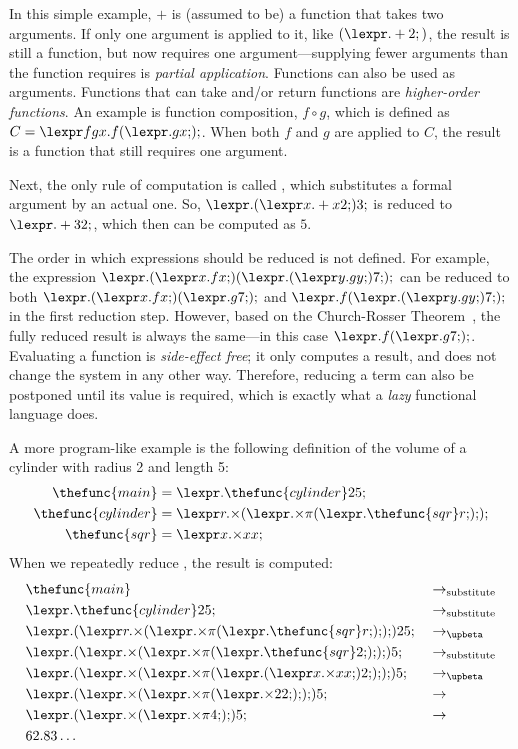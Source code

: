 In this simple example, $+$ is (assumed to be) a function that takes two arguments.
If only one argument is applied to it, like $(\lexpr.+ 2;)$, the result is still a function, but now requires one argument---supplying fewer arguments than the function requires is \emph{partial application}.
Functions can also be used as arguments.
Functions that can take and/or return functions are \emph{higher-order functions}.
An example is function composition, $f\circ g$, which is defined as $C=\lexpr f g x.f ({\lexpr.g x;});$.
When both $f$ and $g$ are applied to $C$, the result is a function that still requires one argument.

Next, the only rule of computation is called \emph{}, which substitutes a formal argument by an actual one.
So, $\lexpr.({\lexpr x.+ x 2;}) 3;$ is reduced to $\lexpr.+ 3 2;$, which then can be computed as $5$.

The order in which expressions should be reduced is not defined.
For example, the expression $\lexpr.({\lexpr x.f x;}) ({\lexpr.({\lexpr y.g y;}) 7;});$ can be reduced to both $\lexpr.({\lexpr x.f x;}) ({\lexpr.g 7;});$ and $\lexpr.f ({\lexpr.({\lexpr y.g y;}) 7;});$ in the first reduction step.
However, based on the Church-Rosser Theorem~\cite{church:conversion}, the fully reduced result is always the same---in this case $\lexpr.f ({\lexpr.g 7;});$.
Evaluating a function is \emph{side-effect free}; it only computes a result, and does not change the system in any other way.
Therefore, reducing a term can also be postponed until its value is required, which is exactly what a \emph{lazy} functional language does.

A more program-like example is the following definition of the volume of a cylinder with radius 2 and length 5:
\begin{align*}
\thefunc{main}		& = \lexpr  .\thefunc{cylinder} 2 5;											\\
\thefunc{cylinder}	& = \lexpr r.{\times} ({\lexpr.{\times} {\pi} ({\lexpr.\thefunc{sqr} r;});});	\\
\thefunc{sqr}		& = \lexpr x.{\times} x x;
\end{align*}
When we repeatedly reduce , the result is computed:
\newcommand{\lcstep}[1]{& #1 \\}
\newcommand{\lcred}[1]{\lcstep{\rightarrow_{#1}}}
\newcommand{\betared}{\lcred{\upbeta}}
\newcommand{\lcsubst}{\lcred{\text{substitute}}}
\begin{align*}
& \thefunc{main}																						& \lcsubst
& \lexpr.\thefunc{cylinder} 2 5;																		& \lcsubst
& \lexpr.({\lexpr r.{\times} ({\lexpr.{\times} {\pi} ({\lexpr.\thefunc{sqr} r;});});}) 2 5;				& \betared
& \lexpr.({\lexpr.{\times} ({\lexpr.{\times} {\pi} ({\lexpr.\thefunc{sqr} 2;});});}) 5;					& \lcsubst
& \lexpr.({\lexpr.{\times} ({\lexpr.{\times} {\pi} ({\lexpr.({\lexpr x.{\times} x x;}) 2;});});}) 5;	& \betared
& \lexpr.({\lexpr.{\times} ({\lexpr.{\times} {\pi} ({\lexpr.{\times} 2 2;});});}) 5;					& \lcred{}
& \lexpr.({\lexpr.{\times} ({\lexpr.{\times} {\pi} 4;});}) 5;											& \lcred{}
& 62.83\ldots
\end{align*}

